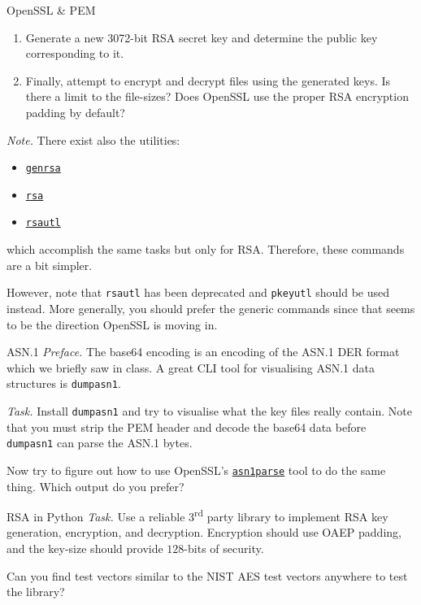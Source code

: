 \documentclass{practice}
\begin{document}
\begin{task}{OpenSSL \& PEM}
\begin{enumerate}
    \item Generate a new 3072-bit RSA secret key and determine the public key corresponding to it.
    \item Finally, attempt to encrypt and decrypt files using the generated keys.
    Is there a limit to the file-sizes?
    Does OpenSSL use the proper RSA encryption padding by default?
  \end{enumerate}

  \textit{Note.}
  There exist also the utilities:
  \begin{itemize}
    \item \href{https://docs.openssl.org/master/man1/openssl-genrsa/}{\texttt{genrsa}}
    \item \href{https://docs.openssl.org/master/man1/openssl-rsa/}{\texttt{rsa}}
    \item \href{https://docs.openssl.org/master/man1/openssl-rsautl/}{\texttt{rsautl}}
  \end{itemize}
  which accomplish the same tasks but only for RSA.
  Therefore, these commands are a bit simpler.

  However, note that \texttt{rsautl} has been deprecated and \texttt{pkeyutl} should be used instead.
  More generally, you should prefer the generic commands since that seems to be the direction OpenSSL is moving in.
\end{task}

\begin{task}{ASN.1}
  \textit{Preface.}
  The base64 encoding is an encoding of the ASN.1 DER format which we briefly saw in class.
  A great CLI tool for visualising ASN.1 data structures is \texttt{dumpasn1}.

  \textit{Task.}
  Install \texttt{dumpasn1} and try to visualise what the key files really contain.
  Note that you must strip the PEM header and decode the base64 data before \texttt{dumpasn1} can parse the ASN.1 bytes.

  Now try to figure out how to use OpenSSL's \href{https://docs.openssl.org/master/man1/openssl-asn1parse/}{\texttt{asn1parse}} tool to do the same thing.
  Which output do you prefer?
\end{task}

\begin{task}{RSA in Python}
  \textit{Task.}
  Use a reliable 3\textsuperscript{rd} party library to implement RSA key generation, encryption, and decryption.
  Encryption should use OAEP padding, and the key-size should provide $128$-bits of security.

  Can you find test vectors similar to the NIST AES test vectors anywhere to test the library?
\end{task}
\end{document}
